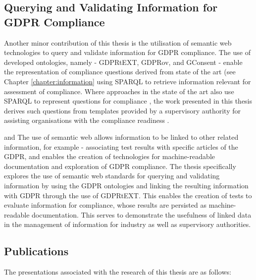 \subsection{Querying and Validating Information for GDPR Compliance}
Another minor contribution of this thesis is the utilisation of semantic web technologies to query and validate information for GDPR compliance.
The use of developed ontologies, namely - GDPRtEXT, GDPRov, and GConsent - enable the representation of compliance questions derived from state of the art (see Chapter \ref{chapter:information} using SPARQL to retrieve information relevant for assessment of compliance.
Where approaches in the state of the art also use SPARQL to represent questions for compliance \cite{agarwal_legislative_2018,palmirani_pronto:_2018}, the work presented in this thesis derives such questions from templates provided by a supervisory authority for assisting organisations with the compliance readiness \cite{noauthor_gdpr_2017}.

and The use of semantic web allows information to be linked to other related information, for example - associating test results with specific articles of the GDPR, and enables the creation of technologies for machine-readable documentation and exploration of GDPR compliance. The thesis specifically explores the use of semantic web standards for querying and validating information by using the GDPR ontologies and linking the resulting information with GDPR through the use of GDPRtEXT. This enables the creation of tests to evaluate information for compliance, whose results are persisted as machine-readable documentation. This serves to demonstrate the usefulness of linked data in the management of information for industry as well as supervisory authorities.

\subsection{Publications}
The presentations associated with the research of this thesis are as follows:

